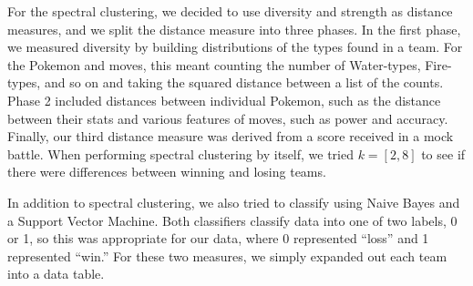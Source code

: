 \documentclass{acm_proc_article-sp}
\begin{document}
For the spectral clustering, we decided to use diversity and strength as distance measures, and we split the distance measure into three phases. In the first phase, we measured diversity by building distributions of the types found in a team. For the Pokemon and moves, this meant counting the number of Water-types, Fire-types, and so on and taking the squared distance between a list of the counts. Phase 2 included distances between individual Pokemon, such as the distance between their stats and various features of moves, such as power and accuracy. Finally, our third distance measure was derived from a score received in a mock battle. When performing spectral clustering by itself, we tried $k=[2, 8]$ to see if there were differences between winning and losing teams.

In addition to spectral clustering, we also tried to classify using Naive Bayes and a Support Vector Machine. Both classifiers classify data into one of two labels, 0 or 1, so this was appropriate for our data, where 0 represented “loss” and 1 represented “win.” For these two measures, we simply expanded out each team into a data table.
\end{document}
